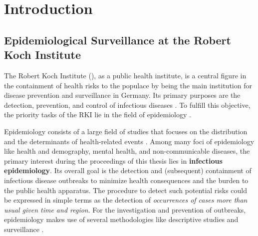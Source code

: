 \chapter{Introduction}

\section{Epidemiological Surveillance at the Robert Koch Institute}
  The Robert Koch Institute (), as a public health institute, is a central figure in the containment of health risks to the populace by being the main institution for disease prevention and surveillance in Germany.
  Its primary purposes are the detection, prevention, and control of infectious diseases \citep{rki_definition}.
  To fulfill this objective, the priority tasks of the RKI lie in the field of epidemiology \citep{rki_definition}.

  Epidemiology consists of a large field of studies that focuses on the distribution and the determinants of health-related events \citep{WHOepi}.
  Among many foci of epidemiology like health and demography, mental health, and non-communicable diseases, the primary interest during the proceedings of this thesis lies in \textbf{infectious epidemiology}.
  Its overall goal is the detection and (subsequent) containment of infectious disease outbreaks to minimize health consequences and the burden to the public health apparatus.
  The procedure to detect such potential risks could be expressed in simple terms as the detection of \textit{occurrences of cases more than usual given time and region}.
  For the investigation and prevention of outbreaks, epidemiology makes use of several methodologies like descriptive studies and surveillance \citep{WHOepi}.


